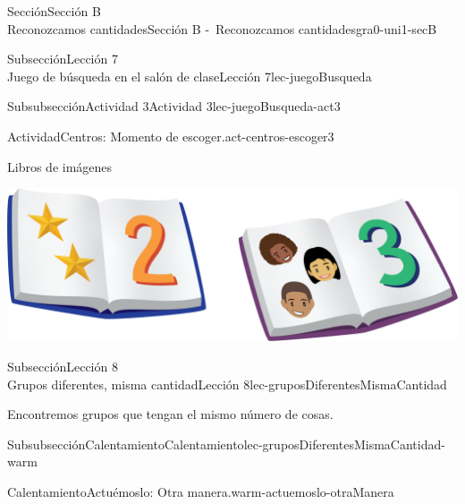 \begin{sectionptx}{Sección}{{\Large Sección B\\}Reconozcamos cantidades}{}{Sección B -~Reconozcamos cantidades}{}{}{gra0-uni1-secB}
\begin{subsectionptx}{Subsección}{{\normalsize Lección 7\\[-0.05cm]}Juego de búsqueda en el salón de clase}{}{Lección 7}{}{}{lec-juegoBusqueda}
\begin{subsubsectionptx}{Subsubsección}{Actividad 3}{}{Actividad 3}{}{}{lec-juegoBusqueda-act3}
\begin{activity}{Actividad}{Centros: Momento de escoger.}{act-centros-escoger3}
\begin{sidebyside}{2}{0.025}{0.025}{0.05}
\begin{sbspanel}{0.45}%
Libros de imágenes%
\par
\includegraphics[max width=\linewidth, center]{external/png-source/K.1.D Beta Student Workbooks.Books.png}
\end{sbspanel}%
\end{sidebyside}%
\end{activity}%
\end{subsubsectionptx}
\end{subsectionptx}
%
%
\typeout{************************************************}
\typeout{************************************************}
%
\begin{subsectionptx}{Subsección}{{\normalsize Lección 8\\[-0.05cm]}Grupos diferentes, misma cantidad}{}{Lección 8}{}{}{lec-gruposDiferentesMismaCantidad}
\begin{introduction}{}%
Encontremos grupos que tengan el mismo número de cosas.%
\end{introduction}%
%
%
\typeout{************************************************}
\typeout{************************************************}
%
\begin{subsubsectionptx}{Subsubsección}{Calentamiento}{}{Calentamiento}{}{}{lec-gruposDiferentesMismaCantidad-warm}
\begin{exploration}{Calentamiento}{Actuémoslo: Otra manera.}{warm-actuemoslo-otraManera}%
\begin{image}{0.0}{1}{0.0}{}%

\end{image}
\end{exploration}
\end{subsubsectionptx}
\end{subsectionptx}
\end{sectionptx}
